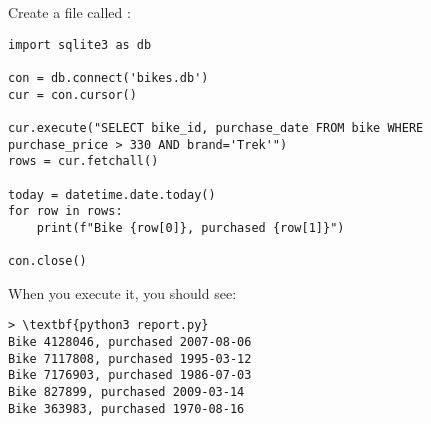 Create a file called :
\begin{Verbatim}
import sqlite3 as db

con = db.connect('bikes.db')
cur = con.cursor()

cur.execute("SELECT bike_id, purchase_date FROM bike WHERE purchase_price > 330 AND brand='Trek'")
rows = cur.fetchall()

today = datetime.date.today()
for row in rows:
    print(f"Bike {row[0]}, purchased {row[1]}")

con.close()
\end{Verbatim}

When you execute it, you should see:
\begin{Verbatim}[commandchars=\\\{\}]
> \textbf{python3 report.py}
Bike 4128046, purchased 2007-08-06
Bike 7117808, purchased 1995-03-12
Bike 7176903, purchased 1986-07-03
Bike 827899, purchased 2009-03-14
Bike 363983, purchased 1970-08-16
\end{Verbatim}
